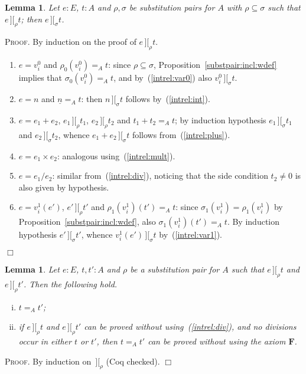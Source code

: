 \documentclass{article}
\newtheorem{lemma}[definition]{Lemma}
\newenvironment{proof}{\smallskip\textsc{Proof.}}{\hspace*{\fill}$\Box$}
\newcommand{\intII}{\,]\![}
\newcommand{\intrel}{\mathbin{\intII_{\rho}}}
\newcommand{\axiom}[1]{\ensuremath{\mathbf{#1}}}
\newcommand{\intrels}{\mathbin{\intII_{\sigma}}}
\begin{document}
\begin{lemma}\label{inclinterp}
Let $e:E$, $t:A$ and $\rho,\sigma$ be substitution pairs for $A$ with
$\rho\subseteq\sigma$ such that $e\intrel t$; then $e\intrels t$.
\end{lemma}
\begin{proof} By induction on the proof of $e\intrel t$.
\begin{enumerate}
\item $e=v^0_i$ and $\rho_0(v^0_i)=_A t$: since $\rho\subseteq\sigma$,
Proposition~\ref{substpair:incl:wdef} implies that $\sigma_0(v^0_i)=_A t$,
and by~(\ref{intrel:var0}) also $v^0_i\intrels t$.
\item $e=n$ and $\underline n=_A t$: then $n\intrels t$ follows
by~(\ref{intrel:int}).
\item $e=e_1+e_2$, $e_1\intrel t_1$, $e_2\intrel t_2$ and $t_1+t_2=_A t$;
by induction hypothesis $e_1\intrels t_1$ and $e_2\intrels t_2$, whence
$e_1+e_2\intrels t$ follows from~(\ref{intrel:plus}).
\item $e=e_1\times e_2$: analogous using~(\ref{intrel:mult}).
\item $e=e_1/e_2$: similar from~(\ref{intrel:div}), noticing that the
side condition $t_2\neq 0$ is also given by hypothesis.
\item $e=v^1_i(e')$, $e'\intrel t'$ and $\rho_1(v^1_i)(t')=_A t$: since
$\sigma_1(v^1_i)=\rho_1(v^1_i)$ by Proposition~\ref{substpair:incl:wdef},
also $\sigma_1(v^1_i)(t')=_A t$.  By induction hypothesis $e'\intrels t'$,
whence $v^1_i(e')\intrels t$ by~(\ref{intrel:var1}).
\end{enumerate}
\end{proof}

\begin{lemma}\label{intrelfunction} Let $e:E$, $t,t':A$ and $\rho$ be
a substitution pair for $A$ such that $e\intrel t$ and $e\intrel t'$.
Then the following hold.
\begin{enumerate}[(i)]
\item $t=_A t'$;
\item if $e\intrel t$ and $e\intrel t'$ can be proved without
using~(\ref{intrel:div}), and no divisions occur in either $t$ or $t'$,
then $t=_A t'$ can be proved without using the axiom \axiom{F}.
\end{enumerate}
\end{lemma}
\begin{proof} By induction on $\intrel$ (Coq checked).
\end{proof}
\end{document}
